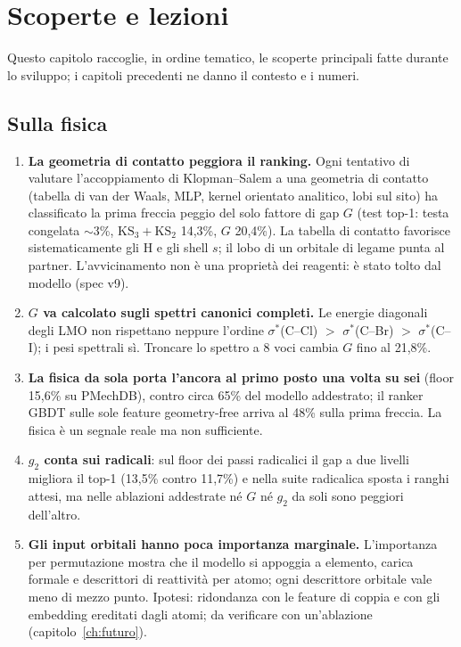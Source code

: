 \documentclass[11pt,a4paper]{report}
\begin{document}
\chapter{Scoperte e lezioni}
\label{ch:scoperte}
Questo capitolo raccoglie, in ordine tematico, le scoperte principali fatte durante lo sviluppo; i
capitoli precedenti ne danno il contesto e i numeri.

\section{Sulla fisica}
\begin{enumerate}
\item \textbf{La geometria di contatto peggiora il ranking.} Ogni tentativo di valutare l'accoppiamento
  di Klopman--Salem a una geometria di contatto (tabella di van der Waals, MLP, kernel orientato
  analitico, lobi sul sito) ha classificato la prima freccia peggio del solo fattore di gap $G$ (test
  top-1: testa congelata $\sim$3\%, $\mathrm{KS}_3+\mathrm{KS}_2$ 14{,}3\%, $G$ 20{,}4\%). La tabella di
  contatto favorisce sistematicamente gli H e gli shell $s$; il lobo di un orbitale di legame punta al
  partner. L'avvicinamento non è una proprietà dei reagenti: è stato tolto dal modello (spec v9).
\item \textbf{$G$ va calcolato sugli spettri canonici completi.} Le energie diagonali degli LMO non
  rispettano neppure l'ordine $\sigma^*$(C--Cl) $>$ $\sigma^*$(C--Br) $>$ $\sigma^*$(C--I); i pesi
  spettrali sì. Troncare lo spettro a 8 voci cambia $G$ fino al 21{,}8\%.
\item \textbf{La fisica da sola porta l'ancora al primo posto una volta su sei} (floor 15{,}6\% su
  PMechDB), contro circa 65\% del modello addestrato; il ranker GBDT sulle sole feature geometry-free
  arriva al 48\% sulla prima freccia. La fisica è un segnale reale ma non sufficiente.
\item \textbf{$g_2$ conta sui radicali}: sul floor dei passi radicalici il gap a due livelli migliora il
  top-1 (13{,}5\% contro 11{,}7\%) e nella suite radicalica sposta i ranghi attesi, ma nelle ablazioni
  addestrate né $G$ né $g_2$ da soli sono peggiori dell'altro.
\item \textbf{Gli input orbitali hanno poca importanza marginale.} L'importanza per permutazione mostra
  che il modello si appoggia a elemento, carica formale e descrittori di reattività per atomo; ogni
  descrittore orbitale vale meno di mezzo punto. Ipotesi: ridondanza con le feature di coppia e con gli
  embedding ereditati dagli atomi; da verificare con un'ablazione (capitolo~\ref{ch:futuro}).
\end{enumerate}
\end{document}
